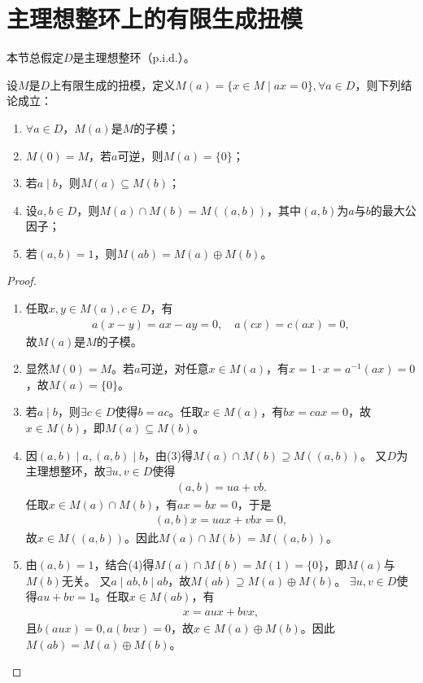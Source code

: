 \documentclass[../../main.tex]{subfiles}%
\begin{document}
\section{主理想整环上的有限生成扭模}

本节总假定$D$是主理想整环（p.i.d.）。

\begin{lemma}
设$M$是$D$上有限生成的扭模，定义$M(a)=\{x\in M\mid ax=0\},\forall a\in D$，则下列结论成立：
\begin{enumerate}[(1)]
\item $\forall a\in D$，$M(a)$是$M$的子模；
\item $M(0)=M$，若$a$可逆，则$M(a)=\{0\}$；
\item 若$a\mid b$，则$M(a)\subseteq M(b)$；
\item 设$a,b\in D$，则$M(a)\cap M(b)=M((a,b))$，其中$(a,b)$为$a$与$b$的最大公因子；
\item 若$(a,b)=1$，则$M(ab)=M(a)\oplus M(b)$。
\end{enumerate}
\end{lemma}
\begin{proof}
\begin{enumerate}[(1)]
\item 任取$x,y\in M(a),c\in D$，有
\begin{align*}
a(x-y)=ax-ay=0,\quad a(cx)=c(ax)=0,
\end{align*}
故$M(a)$是$M$的子模。

\item 显然$M(0)=M$。若$a$可逆，对任意$x\in M(a)$，有$x=1\cdot x=a^{-1}(ax)=0$，故$M(a)=\{0\}$。

\item 若$a\mid b$，则$\exists c\in D$使得$b=ac$。任取$x\in M(a)$，有$bx=cax=0$，故$x\in M(b)$，即$M(a)\subseteq M(b)$。

\item 因$(a,b)\mid a,(a,b)\mid b$，由(3)得$M(a)\cap M(b)\supseteq M((a,b))$。
又$D$为主理想整环，故$\exists u,v\in D$使得
\begin{align*}
(a,b)=ua+vb.
\end{align*}
任取$x\in M(a)\cap M(b)$，有$ax=bx=0$，于是
\begin{align*}
(a,b)x=uax+vbx=0,
\end{align*}
故$x\in M((a,b))$。因此$M(a)\cap M(b)=M((a,b))$。

\item 由$(a,b)=1$，结合(4)得$M(a)\cap M(b)=M(1)=\{0\}$，即$M(a)$与$M(b)$无关。
又$a\mid ab,b\mid ab$，故$M(ab)\supseteq M(a)\oplus M(b)$。
$\exists u,v\in D$使得$au+bv=1$。任取$x\in M(ab)$，有
\begin{align*}
x=aux+bvx,
\end{align*}
且$b(aux)=0,a(bvx)=0$，故$x\in M(a)\oplus M(b)$。因此$M(ab)=M(a)\oplus M(b)$。
\end{enumerate}

\end{proof}
\end{document}
